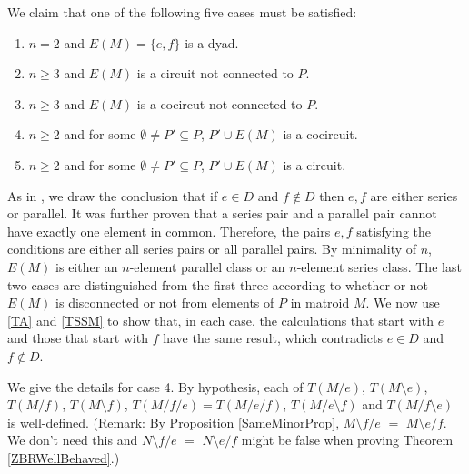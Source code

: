 \documentclass[12pt,leqno]{amsart}
\theoremstyle{remark}
\begin{document}
We claim that one of the following five cases must be satisfied:
\begin{enumerate}
\item 
$n=2$ and $E(M)=\{e,f\}$ is a dyad.
\item
$n\geq 3$ and $E(M)$ is a circuit not connected to $P$.
\item
$n\geq 3$ and $E(M)$ is a cocircut not connected to $P$.
\item
$n\geq 2$ and for some $\emptyset\neq P'\subseteq P$,
$P'\cup E(M)$ is a cocircuit.
\item
$n\geq 2$ and for some $\emptyset\neq P'\subseteq P$,
$P'\cup E(M)$ is a circuit.
\end{enumerate}



As in  \cite{Ellis-Monaghan-Traldi}, we draw the conclusion that
if $e\in D$ and $f\not\in D$ then $e, f$ are either series or parallel. 
It was further proven that a series pair and a parallel pair cannot
have exactly one element in common.  Therefore, the pairs $e,f$ satisfying 
the conditions are either all series pairs or all parallel pairs.  By 
minimality of $n$, $E(M)$ is either an $n$-element parallel class or an 
$n$-element series class.  The last two cases are distinguished from
the first three according to whether or not $E(M)$ is disconnected or not
from elements of $P$ in matroid $M$.  We now use \eqref{TA} and \eqref{TSSM}
to show that, in each case, the calculations that start with $e$ and 
those that start with $f$
have the same result, which contradicts $e\in D$ and $f\not\in D$.

We give the details for case 4.  By hypothesis, 
each of $T(M/e)$, $T(M\setminus e)$, $T(M/f)$, $T(M\setminus f)$,
$T(M/f/e)=T(M/e/f)$, $T(M/e\setminus f)$ and 
$T(M/f\setminus e)$ is well-defined.  (Remark:
By Proposition \ref{SameMinorProp},
$M\setminus f/e$ $=$ 
$M\setminus e/f$.  We don't need this and 
$N\setminus f/e$ $=$ 
$N\setminus e/f$ might be false when proving Theorem \ref{ZBRWellBehaved}.)
\end{document}
